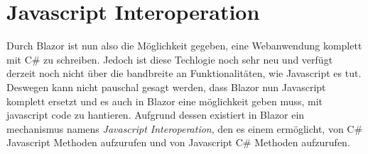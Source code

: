 \section{Javascript Interoperation}
\label{subsec:jsInteroperation}
Durch Blazor ist nun also die Möglichkeit gegeben, eine Webanwendung komplett mit C\# zu
schreiben. Jedoch ist diese Techlogie noch sehr neu und verfügt derzeit noch nicht über die
bandbreite an Funktionalitäten, wie Javascript es tut. Deswegen kann nicht pauschal gesagt
werden, dass Blazor nun Javascript komplett ersetzt und es auch in Blazor eine möglichkeit geben
muss, mit javascript code zu hantieren. Aufgrund dessen existiert in Blazor ein mechanismus
namens \emph{Javascript Interoperation}, den es einem ermöglicht, von C\# Javascript Methoden
aufzurufen und von Javascript C\# Methoden aufzurufen.


